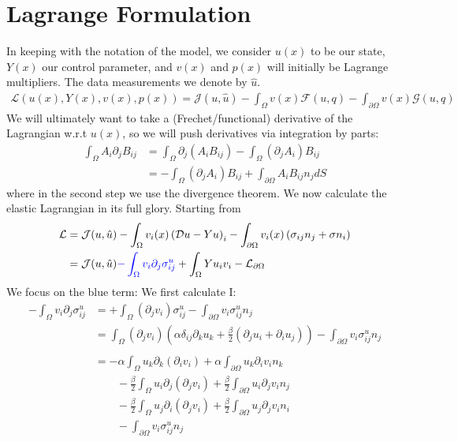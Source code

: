 \documentclass{article}
\begin{document}
\section{Lagrange Formulation}
In keeping with the notation of the model, we consider $u(x)$ to be our state, $Y(x)$ our control parameter, and $v(x)$ and $p(x)$ will initially be Lagrange multipliers. The data measurements we denote by $\hat u$.
\begin{align*}
    \mathcal{L}(u(x), Y(x), v(x), p(x)) = \mathcal{J}(u,\hat u) - \int_{\Omega} v(x)\mathcal{F}(u, q) - \int_{\partial\Omega}v(x)\mathcal{G}(u, q)
\end{align*}
We will ultimately want to take a (Frechet/functional) derivative of the Lagrangian w.r.t $u(x)$, so we will push derivatives via integration by parts:
\begin{align*}
    \int_\Omega A_{i} \partial_j B_{ij} 
    &=\int_\Omega \partial_j (A_{i} B_{ij} ) -\int_\Omega  (\partial_j A_{i}) B_{ij} 
    \\
    &= -\int_\Omega  (\partial_j A_{i}) B_{ij} +
    \int_{\partial\Omega} A_{i} B_{ij} n_j dS
\end{align*}
where in the second step we use the divergence theorem.
We now calculate the elastic Lagrangian in its full glory. Starting from 
\begin{align*}
    \mathcal{L} &= \mathcal{J}(u,\hat u) - \int_{\Omega} v_i(x) \left(\mathcal{D}u - Yu \right)_i - \int_{\partial\Omega}v_i(x)\left(\sigma_{ij}n_j + \sigma n_i\right)
    \\
    &= \mathcal{J}(u,\hat u) {\color{blue}- \int_{\Omega} v_i \partial_j \sigma_{ij}^{u}} + \int_{\Omega}Yu_iv_i - \mathcal{L}_{\partial\Omega}
\end{align*}
We focus on the blue term:
We first calculate I:
\begin{align*}
    - \int_{\Omega} v_i \partial_j \sigma_{ij}^{u} &= + \int_{\Omega} (\partial_j v_i)  \sigma_{ij}^{u} - \int_{\partial\Omega} v_i \sigma_{ij}^{u}n_j
    \\
    &= \int_{\Omega} (\partial_j v_i) \left(\alpha \delta_{ij}\partial_k u_k + \frac{\beta}{2}(\partial_j u_i + \partial_i u_j)\right) - \int_{\partial\Omega} v_i \sigma_{ij}^{u}n_j
    \\
    \\
    &= -\alpha\int_{\Omega} u_k \partial_k(\partial_i v_i) + \alpha\int_{\partial\Omega}u_k \partial_i v_i n_k
    \\
    &\quad\quad-\frac{\beta}{2}\int_{\Omega} u_i\partial_j(\partial_j v_i) +\frac{\beta}{2}\int_{\partial\Omega}u_i\partial_j v_i n_j
    \\
    &\quad\quad-\frac{\beta}{2}\int_{\Omega} u_j\partial_i(\partial_j v_i) +\frac{\beta}{2}\int_{\partial\Omega}u_j\partial_j v_i n_i
    \\
    &\quad\quad- \int_{\partial\Omega} v_i \sigma_{ij}^{u}n_j
\end{align*}
\end{document}
